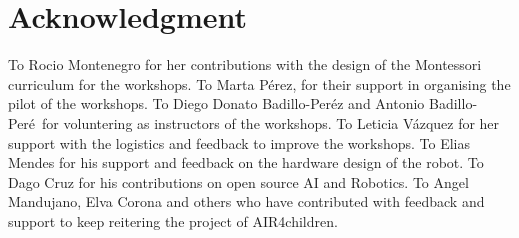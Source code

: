 \documentclass[conference]{IEEEtran}
\begin{document}
\section*{Acknowledgment}
To Rocio Montenegro for her contributions with the design of the Montessori curriculum for the workshops.
To Marta P\'erez, for their support in organising the pilot of the workshops.
To Diego Donato Badillo-Per\'ez and Antonio Badillo-Per\'e\ for voluntering as instructors of the workshops.
To Leticia V\'azquez for her support with the logistics and feedback to improve the workshops.
To Elias Mendes for his support and feedback on the hardware design of the robot.
To Dago Cruz for his contributions on open source AI and Robotics.
To Angel Mandujano, Elva Corona and others who have contributed with feedback and support to keep reitering the project of AIR4children. 



\end{document}
